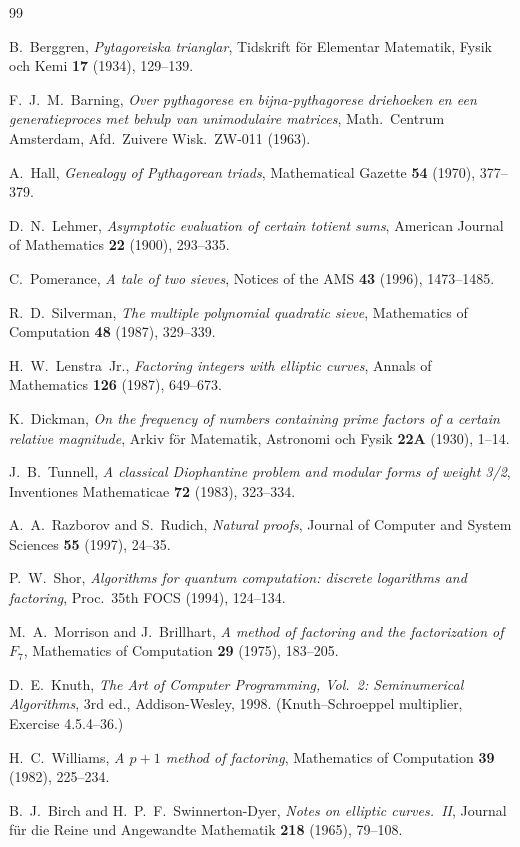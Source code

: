 \documentclass[12pt]{amsart}
\theoremstyle{definition}
\theoremstyle{remark}
\begin{document}
\begin{thebibliography}{99}

B.~Berggren,
\emph{Pytagoreiska trianglar},
Tidskrift f\"or Elementar Matematik, Fysik och Kemi \textbf{17} (1934), 129--139.

F.~J.~M.~Barning,
\emph{Over pythagorese en bijna-pythagorese driehoeken en een generatieproces met behulp van unimodulaire matrices},
Math.\ Centrum Amsterdam, Afd.\ Zuivere Wisk.\ ZW-011 (1963).

A.~Hall,
\emph{Genealogy of Pythagorean triads},
Mathematical Gazette \textbf{54} (1970), 377--379.

D.~N.~Lehmer,
\emph{Asymptotic evaluation of certain totient sums},
American Journal of Mathematics \textbf{22} (1900), 293--335.

C.~Pomerance,
\emph{A tale of two sieves},
Notices of the AMS \textbf{43} (1996), 1473--1485.

R.~D.~Silverman,
\emph{The multiple polynomial quadratic sieve},
Mathematics of Computation \textbf{48} (1987), 329--339.

H.~W.~Lenstra~Jr.,
\emph{Factoring integers with elliptic curves},
Annals of Mathematics \textbf{126} (1987), 649--673.

K.~Dickman,
\emph{On the frequency of numbers containing prime factors of a certain relative magnitude},
Arkiv f\"or Matematik, Astronomi och Fysik \textbf{22A} (1930), 1--14.

J.~B.~Tunnell,
\emph{A classical Diophantine problem and modular forms of weight 3/2},
Inventiones Mathematicae \textbf{72} (1983), 323--334.

A.~A.~Razborov and S.~Rudich,
\emph{Natural proofs},
Journal of Computer and System Sciences \textbf{55} (1997), 24--35.

P.~W.~Shor,
\emph{Algorithms for quantum computation: discrete logarithms and factoring},
Proc.\ 35th FOCS (1994), 124--134.

M.~A.~Morrison and J.~Brillhart,
\emph{A method of factoring and the factorization of $F_7$},
Mathematics of Computation \textbf{29} (1975), 183--205.

D.~E.~Knuth,
\emph{The Art of Computer Programming, Vol.~2: Seminumerical Algorithms},
3rd ed., Addison-Wesley, 1998.  (Knuth--Schroeppel multiplier, Exercise 4.5.4--36.)

H.~C.~Williams,
\emph{A $p+1$ method of factoring},
Mathematics of Computation \textbf{39} (1982), 225--234.

B.~J.~Birch and H.~P.~F.~Swinnerton-Dyer,
\emph{Notes on elliptic curves.\ II},
Journal f\"ur die Reine und Angewandte Mathematik \textbf{218} (1965), 79--108.

\end{thebibliography}
\end{document}
